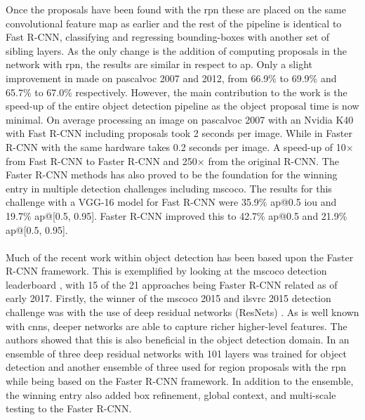 Once the proposals have been found with the \gls{rpn} these are placed on the same convolutional feature map as earlier and the rest of the pipeline is identical to Fast R-CNN, classifying and regressing bounding-boxes with another set of sibling layers. As the only change is the addition of computing proposals in the network with \gls{rpn}, the results are similar in respect to \gls{ap}. Only a slight improvement in made on \gls{pascalvoc} 2007 and 2012, from 66.9\% to 69.9\% and 65.7\% to 67.0\% respectively. However, the main contribution to the work is the speed-up of the entire object detection pipeline as the object proposal time is now minimal. On average processing an image on \gls{pascalvoc} 2007 with an Nvidia K40 with Fast R-CNN including proposals took 2 seconds per image. While in Faster R-CNN with the same hardware takes 0.2 seconds per image. A speed-up of 10$\times$ from Fast R-CNN to Faster R-CNN and 250$\times$ from the original R-CNN. The Faster R-CNN methods has also proved to be the foundation for the winning entry in multiple detection challenges including \gls{mscoco}. The results for this challenge with a VGG-16 model for Fast R-CNN were 35.9\% \gls{ap}@0.5 \gls{iou} and 19.7\% \gls{ap}@[0.5, 0.95]. Faster R-CNN improved this to 42.7\% \gls{ap}@0.5 and 21.9\% \gls{ap}@[0.5, 0.95].
\\\\
Much of the recent work within object detection has been based upon the Faster R-CNN framework. This is exemplified by looking at the \gls{mscoco} detection leaderboard \cite{cocolead}, with 15 of the 21 approaches being Faster R-CNN related as of early 2017. Firstly, the winner of the \gls{mscoco} 2015 and \gls{ilsvrc} 2015 detection challenge was with the use of deep residual networks (ResNets) \cite{deepres}. As is well known with \glspl{cnn}, deeper networks are able to capture richer higher-level features. The authors showed that this is also beneficial in the object detection domain. In \cite{deepres} an ensemble of three deep residual networks with 101 layers was trained for object detection and another ensemble of three used for region proposals with the \gls{rpn} while being based on the Faster R-CNN framework. In addition to the ensemble, the winning entry also added box refinement, global context, and multi-scale testing to the Faster R-CNN.
\\\\
